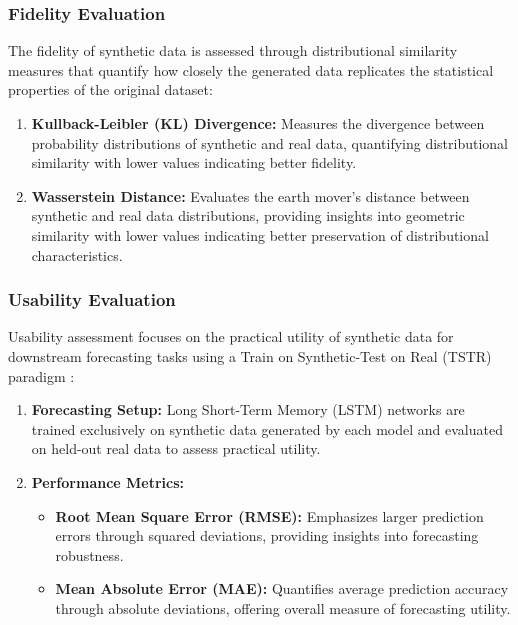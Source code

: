 \documentclass{article}
\begin{document}
\subsubsection{Fidelity Evaluation}
The fidelity of synthetic data is assessed through distributional similarity measures that quantify how closely the generated data replicates the statistical properties of the original dataset:

\begin{enumerate}
    \item \textbf{Kullback-Leibler (KL) Divergence:} Measures the divergence between probability distributions of synthetic and real data, quantifying distributional similarity with lower values indicating better fidelity.
    
    \item \textbf{Wasserstein Distance:} Evaluates the earth mover's distance between synthetic and real data distributions, providing insights into geometric similarity with lower values indicating better preservation of distributional characteristics.
\end{enumerate}

\subsubsection{Usability Evaluation}
Usability assessment focuses on the practical utility of synthetic data for downstream forecasting tasks using a Train on Synthetic-Test on Real (TSTR) paradigm \Parencite{HERNANDEZ202228}:

\begin{enumerate}
    \item \textbf{Forecasting Setup:} Long Short-Term Memory (LSTM) networks are trained exclusively on synthetic data generated by each model and evaluated on held-out real data to assess practical utility.
    
    \item \textbf{Performance Metrics:} 
    \begin{itemize}
        \item \textbf{Root Mean Square Error (RMSE):} Emphasizes larger prediction errors through squared deviations, providing insights into forecasting robustness.
        \item \textbf{Mean Absolute Error (MAE):} Quantifies average prediction accuracy through absolute deviations, offering overall measure of forecasting utility.
    \end{itemize}
\end{enumerate}
\end{document}
